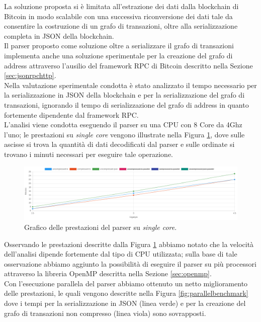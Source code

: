 La soluzione proposta si è limitata all'estrazione dei dati dalla blockchain di Bitcoin in modo scalabile con una successiva riconversione dei dati tale da consentire la costruzione di un grafo di transazioni, oltre alla serializzazione completa in JSON della blockchain.\\
Il parser proposto come soluzione oltre a serializzare il grafo di transazioni implementa anche una soluzione sperimentale per la creazione del grafo di address attraverso l'ausilio del framework RPC di Bitcoin descritto nella Sezione \ref{sec:jsonrpchttp}.\\
Nella valutazione sperimentale condotta è stato analizzato il tempo necessario   per la serializzazione in JSON della blockchain e per la serializzazione del grafo di transazioni, ignorando il tempo di serializzazione del grafo di address in quanto fortemente dipendente dal framework RPC.\\
L'analisi viene condotta eseguendo il parser su una CPU  con 8 Core da 4Ghz l'uno; le prestazioni su \emph{single core} vengono illustrate nella Figura \ref{fig:noparallelbenchmark}, dove sulle ascisse si trova la quantità di dati decodificati dal parser e sulle ordinate si trovano  i minuti necessari per eseguire tale operazione.
\begin{figure}[H]
\centering
 \includegraphics[scale=0.2]{images/demo/no_paralel_benckmark.png}
 \caption{Grafico delle prestazioni del parser su \emph{single core}.}\label{fig:noparallelbenchmark}
\end{figure}

Osservando le prestazioni descritte dalla Figura \ref{fig:noparallelbenchmark} abbiamo notato che la velocità dell'analisi dipende fortemente dal tipo di CPU utilizzata; sulla base di tale  osservazione abbiamo aggiunto la possibilità di eseguire il parser su più processori attraverso la libreria OpenMP descritta nella Sezione \ref{sec:openmp}.\\
Con l'esecuzione parallela del parser abbiamo ottenuto un netto miglioramento delle prestazioni, le quali vengono descritte nella Figura \ref{fig:parallelbenchmark} dove i tempi  per la serializzazione in JSON (linea verde) e per la creazione del grafo di transazioni non compresso (linea viola) sono sovrapposti.\\

